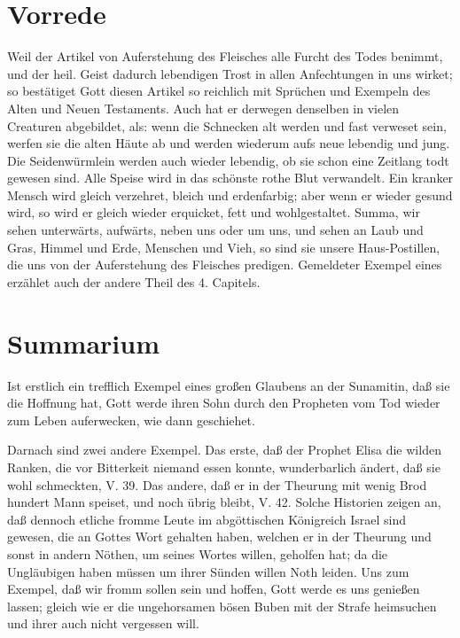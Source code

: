 \section{Vorrede}

Weil der Artikel von Auferstehung des Fleisches alle Furcht des Todes benimmt, und der heil. Geist dadurch lebendigen Trost in allen Anfechtungen in uns wirket; so bestätiget Gott diesen Artikel so reichlich mit Sprüchen und Exempeln des Alten und Neuen Testaments. Auch hat er derwegen denselben in vielen Creaturen abgebildet, als: wenn die Schnecken alt werden und fast verweset sein, werfen sie die alten Häute ab und werden wiederum aufs neue lebendig und jung. Die Seidenwürmlein werden auch wieder lebendig, ob sie schon eine Zeitlang todt gewesen sind. Alle Speise wird in das schönste rothe Blut verwandelt. Ein kranker Mensch wird gleich verzehret, bleich und erdenfarbig; aber wenn er wieder gesund wird, so wird er gleich wieder erquicket, fett und wohlgestaltet. Summa, wir sehen unterwärts, aufwärts, neben uns oder um uns, und sehen an Laub und Gras, Himmel und Erde, Menschen und Vieh, so sind sie unsere Haus-Postillen, die uns von der Auferstehung des Fleisches predigen. Gemeldeter Exempel eines erzählet auch der andere Theil des 4. Capitels.

\section{Summarium}

Ist erstlich ein trefflich Exempel eines großen Glaubens an der Sunamitin, daß sie die Hoffnung hat, Gott werde ihren Sohn durch den Propheten vom Tod wieder zum Leben auferwecken, wie dann geschiehet.

Darnach sind zwei andere Exempel. Das erste, daß der Prophet Elisa die wilden Ranken, die vor Bitterkeit niemand essen konnte, wunderbarlich ändert, daß sie wohl schmeckten, V. 39. Das andere, daß er in der Theurung mit wenig Brod hundert Mann speiset, und noch übrig bleibt, V. 42. Solche Historien zeigen an, daß dennoch etliche fromme Leute im abgöttischen Königreich Israel sind gewesen, die an Gottes Wort gehalten haben, welchen er in der Theurung und sonst in andern Nöthen, um seines Wortes willen, geholfen hat; da die Ungläubigen haben müssen um ihrer Sünden willen Noth leiden. Uns zum Exempel, daß wir fromm sollen sein und hoffen, Gott werde es uns genießen lassen; gleich wie er die ungehorsamen bösen Buben mit der Strafe heimsuchen und ihrer auch nicht vergessen will.

